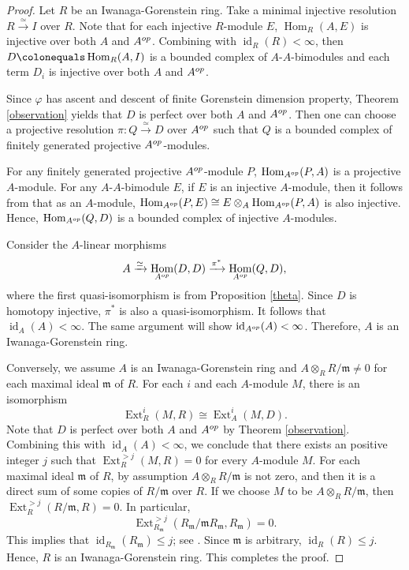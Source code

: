 \documentclass{amsart}
\newcommand{\0}{{\bf{0}}}
\newcommand{\m}{\mathfrak{m}}
\DeclareMathOperator{\id}{id}
\DeclareMathOperator{\Hom}{Hom}
\DeclareMathOperator{\Ext}{Ext}
\theoremstyle{definition}
\begin{document}
\begin{proof}
Let $R$ be an Iwanaga-Gorenstein ring. Take a minimal injective resolution $ R\xrightarrow \simeq I$ over $R$.
Note that for each injective $R$-module $E$, $\Hom_R(A,E)$ is injective over both $A$ and $A^{\rm op}$. Combining with $\id_R(R)<\infty$, then $D\colonequals\Hom_R(A,I)$ is a bounded complex of $A\mbox{-}A$-bimodules and each term $D_i$ is injective over both $A$ and $A^{\rm op}$.

Since $\varphi$ has ascent and descent of finite Gorenstein dimension property, Theorem \ref{observation}  yields that $D$ is perfect over both $A$ and $A^{\rm op}$. Then one can choose a projective resolution $\pi\colon Q\xrightarrow \simeq D$ over $A^{\rm op}$ such that $Q$ is a bounded complex of finitely generated projective $A^{\rm op}$-modules.

For any finitely generated projective $A^{\rm op}$-module $P$, $\Hom_{A^{\rm op}}(P,A)$ is a projective $A$-module.
For any $A\mbox{-}A$-bimodule $E$, if $E$ is an injective $A$-module, then it follows from \cite[Theorem 3.2.16]{EJ} that as an $A$-module, $\Hom_{A^{\rm op}}(P,E)\cong E\otimes_A \Hom_{A^{\rm op}}(P,A)$ is also injective.
Hence, $\Hom_{A^{\rm op}}(Q,D)$ is a bounded complex of injective $A$-modules.

Consider the  $A$-linear morphisms
\begin{align*}
    A\xrightarrow \simeq \Hom_{A^{\rm op}}(D,D)
     \xrightarrow {\pi^\ast} \Hom_{A^{\rm op}}(Q,D),
\end{align*}
where the first quasi-isomorphism is from Proposition \ref{theta}. Since $D$ is homotopy injective, $\pi^\ast$ is also a quasi-isomorphism. It follows that $\id_A(A)<\infty$. The same argument will show $\id_{A^{\rm op}}(A)<\infty$. Therefore, $A$ is an Iwanaga-Gorenstein ring.

Conversely, we assume $A$ is an Iwanaga-Gorenstein ring and $A\otimes_R R/\m\neq 0$ for each maximal ideal $\m$ of $R$. For each $i$ and each  $A$-module $M$, there is an isomorphism
$$\Ext^i_R(M,R)\cong \Ext^i_A(M,D).$$
Note that $D$ is perfect over both $A$ and $A^{\rm op}$ by Theorem \ref{observation}. Combining this with $\id_A(A)<\infty$, we conclude that there exists an positive integer $j$ such that $\Ext^{>j}_R(M, R)=0$ for every  $A$-module $M$. For each maximal ideal $\m$ of $R$, by assumption $A\otimes_R R/\m$ is not zero, and then it is a direct sum of some copies of $R/\m$ over $R$. If we choose $M$ to be $A\otimes_R R/\m$, then $\Ext^{>j}_R(R/\m,R)=0$.
In particular, $$\Ext^{>j}_{R_\m}(R_\m/\m R_\m,R_\m)=0.$$
This implies that $\id_{R_\m}(R_\m)\leq j$; see \cite[Proposition 3.1.14]{BH}. Since $\m$ is arbitrary, $\id_R(R)\leq j$.
Hence, $R$ is an Iwanaga-Gorenstein ring. This completes the proof.
\end{proof}
\end{document}
